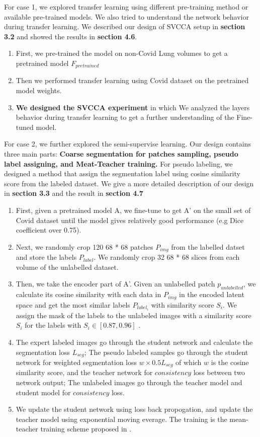  For case 1, we explored transfer learning using different pre-training method or available pre-trained models. We also tried to understand the network behavior during transfer learning. We described our design of SVCCA setup in \textbf{section 3.2} and showed the results in \textbf{section 4.6}. \\
 \begin{enumerate}
 	\item First, we pre-trained the model on non-Covid Lung volumes to get a pretrained model $F_{pretrained}$
 	\item  Then we performed transfer learning using Covid dataset on the pretrained model weights.
 	\item \textbf{We designed the SVCCA experiment} in which We analyzed the layers behavior during transfer learning to get a further understanding of the Fine-tuned model. 
 \end{enumerate}
 
 For case 2, we further explored the semi-supervise learning. Our design  contains three main parts: \textbf{Coarse segmentation for patches sampling, pseudo label assigning, and Meat-Teacher training.} For pseudo labeling, we designed a method that assign the segmentation label using cosine similarity score from the labeled dataset. We give a more detailed description of our design in \textbf{section 3.3} and the result in \textbf{section 4.7}
 \begin{enumerate}
 	\item First, given a pretrained model A, we fine-tune to get A' on the small set of Covid dataset until the model gives relatively good performance (e.g Dice coefficient over 0.75).
 	\item Next, we randomly crop 120 68 * 68 patches $P_{img}$ from the labelled datset and store the labels $P_{label}$. We randomly crop 32 68 * 68 slices from each volume of the unlabelled dataset.
 	\item Then, we take the encoder part of A'. Given an unlabelled patch $p_{unlabelled}$, we calculate its cosine similarity with each data in $P_{img}$ in the encoded latent space and get the most similar labels $P_{label_{i}}$ with similarity score $S_{i}$. We assign the mask of the labels to the unlabeled images with a similarity score $S_{i}$ for the labels with \textbf{$S_{i} \in [0.87, 0.96]$ }.
 	\item The expert labeled images go through the student network and calculate the segmentation loss $L_{seg}$; The pseudo labeled samples go through the student network for weighted segmentation loss $w \times 0.5 L_{seg}$ of which $w$ is the cosine similarity score, and the teacher network for $consistency$ loss between two network output; The unlabeled images go through the teacher model and student model for $consistency$ loss.
 	\item We update the student network using loss back propogation, and update the teacher model using exponential moving everage. The training is the mean-teacher training scheme proposed in \cite{tarvainen_mean_2018}.
 	\end{enumerate}

